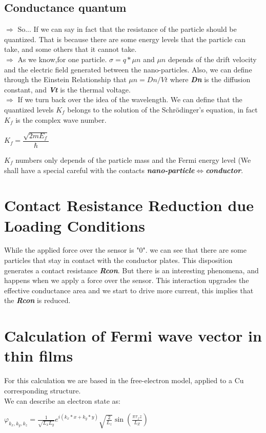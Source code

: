 \documentclass[11pt,a4paper,draft]{article}
\begin{document}
\subsection{Conductance quantum}
$\Rightarrow$ So... If we can say in fact that the resistance of the particle should be quantized. That is because there are some energy levels that the particle can take, and some others that it cannot take.\\
$\Rightarrow$ As we know,for one particle. $\sigma= q*\mu n$ and \emph{\textbf{$ \mu n $}} depends of the drift velocity and the electric field generated between the nano-particles. Also, we can define through the Einstein Relationship that $ \mu n=Dn/Vt $ where \emph{\textbf{Dn}} is the diffusion constant, and \emph{\textbf{Vt}} is the thermal voltage.
\\
$\Rightarrow$ If we turn back over the idea of the wavelength. We can define that the quantized levels $ K_{f} $ belongs to the solution of the Schrödinger's equation, in fact $ K_{f} $ is the complex wave number.
\begin{center}
$   K_{f}=\dfrac{\sqrt{2mE_{f}}}{\hbar} $
\end{center}
$ K_{f} $ numbers only depends of the particle mass and the Fermi energy level (We shall have a special careful with the contacts \emph{\textbf{nano-particle$\Leftrightarrow$conductor}}.
\section{Contact Resistance Reduction due Loading Conditions}
While the applied force over the sensor is "0". we can see that there are some particles that stay in contact with the conductor plates. This disposition generates a contact resistance \emph{\textbf{Rcon}}. But there is an interesting phenomena, and happens when we apply a force over the sensor. This interaction upgrades the effective conductance area and we start to drive more current, this implies that the \emph{\textbf{Rcon}} is reduced. 
\section{Calculation of Fermi wave vector in thin films} For this calculation we are based in the free-electron model, applied to a Cu corresponding structure.\\
We can describe an electron state as:\\
\begin{center}
$ \displaystyle{ \varphi  }_{ k_{ x },{ k }_{ y },{ k }_{ z } }=\frac { 1 }{ \sqrt { { L }_{ x }{ L }_{ y } }  } { e }^{ i({ k }_{ x }*x+{ k }_{ y }*y) }\sqrt { \frac { 2 }{ { L }_{ z } }  } \sin { (\frac { \pi { \tau  }_{ z }z }{ { L }_{ Z } } ) }  $\\
\end{center}
\end{document}
